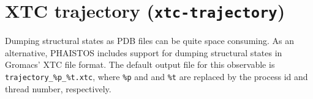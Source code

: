 \section{XTC trajectory (\texttt{xtc-trajectory})}
\label{sec:observable-xtc-trajectory}

Dumping structural states as PDB files can be quite space
consuming. As an alternative, PHAISTOS includes support for dumping
structural states in Gromacs' XTC file format. The default output file
for this observable is \texttt{trajectory\_\%p\_\%t.xtc}, where
\texttt{\%p} and and \texttt{\%t} are replaced by the process id and
thread number, respectively.
